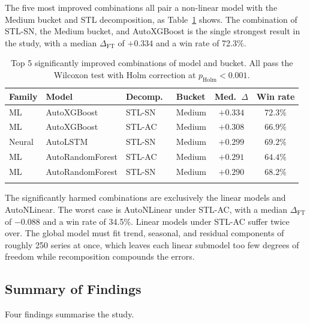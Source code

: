 \documentclass[pdflatex,sn-mathphys-num]{sn-jnl}
\theoremstyle{thmstyleone}
\theoremstyle{thmstyletwo}
\theoremstyle{thmstylethree}
\begin{document}
The five most improved combinations all pair a non-linear model with the
Medium bucket and STL decomposition, as Table~\ref{tab:top5_sig} shows. The
combination of STL-SN, the Medium bucket, and AutoXGBoost is the single
strongest result in the study, with a median $\Delta_{\mathrm{FT}}$ of
$+0.334$ and a win rate of 72.3\%.

\begin{table}[ht]
\caption{Top 5 significantly improved combinations of model and bucket. All
pass the Wilcoxon test with Holm correction at
$p_{\mathrm{Holm}} < 0.001$.}\label{tab:top5_sig}
\begin{tabular*}{\textwidth}{@{\extracolsep\fill}llllcc}
\toprule
Family & Model & Decomp.\ & Bucket & Med.\ $\Delta$ & Win rate \\
\midrule
ML          & AutoXGBoost      & STL-SN & Medium & $+0.334$ & $72.3\%$ \\
ML          & AutoXGBoost      & STL-AC & Medium & $+0.308$ & $66.9\%$ \\
Neural      & AutoLSTM         & STL-SN & Medium & $+0.299$ & $69.2\%$ \\
ML          & AutoRandomForest & STL-AC & Medium & $+0.291$ & $64.4\%$ \\
ML          & AutoRandomForest & STL-SN & Medium & $+0.290$ & $68.2\%$ \\
\botrule
\end{tabular*}
\end{table}

The significantly harmed combinations are exclusively the linear models and
AutoNLinear. The worst case is AutoNLinear under STL-AC, with a median
$\Delta_{\mathrm{FT}}$ of $-0.088$ and a win rate of 34.5\%. Linear models
under STL-AC suffer twice over. The global model must fit trend, seasonal, and
residual components of roughly 250 series at once, which leaves each linear
submodel too few degrees of freedom while recomposition compounds the errors.

\subsection{Summary of Findings}\label{sec:summary}

Four findings summarise the study.
\end{document}
